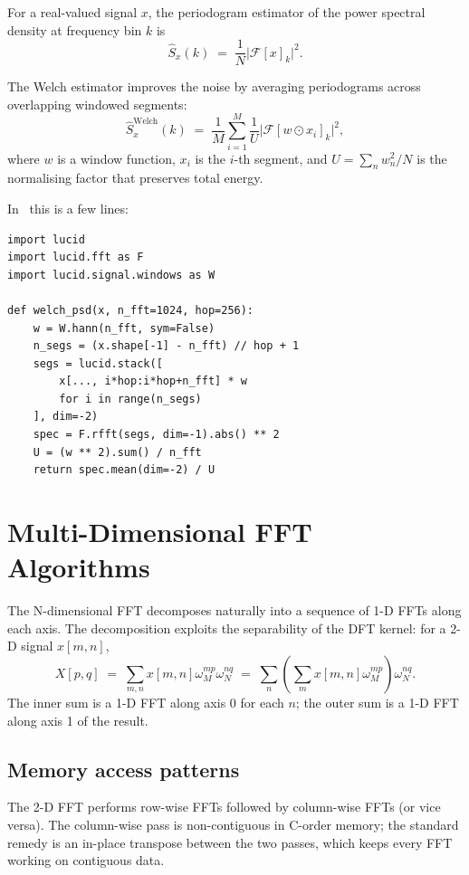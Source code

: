 For a real-valued signal $x$, the periodogram estimator of the
power spectral density at frequency bin $k$ is
\[
\hat S_x(k) \;=\; \frac{1}{N} \bigl|\mathcal{F}[x]_k\bigr|^2.
\]

The Welch estimator \cite{welch_psd_1967} improves the noise by
averaging periodograms across overlapping windowed segments:
\[
\hat S_x^{\mathrm{Welch}}(k)
\;=\; \frac{1}{M} \sum_{i=1}^M \frac{1}{U}\bigl|\mathcal{F}[w \odot x_i]_k\bigr|^2,
\]
where $w$ is a window function, $x_i$ is the $i$-th segment,
and $U = \sum_n w_n^2 / N$ is the normalising factor that
preserves total energy.

In \Lucid\ this is a few lines:

\begin{lstlisting}[style=lucid,language=LucidPython]
import lucid
import lucid.fft as F
import lucid.signal.windows as W

def welch_psd(x, n_fft=1024, hop=256):
    w = W.hann(n_fft, sym=False)
    n_segs = (x.shape[-1] - n_fft) // hop + 1
    segs = lucid.stack([
        x[..., i*hop:i*hop+n_fft] * w
        for i in range(n_segs)
    ], dim=-2)
    spec = F.rfft(segs, dim=-1).abs() ** 2
    U = (w ** 2).sum() / n_fft
    return spec.mean(dim=-2) / U
\end{lstlisting}

\section{Multi-Dimensional FFT Algorithms}
\label{sec:fft:nd_algorithms}

The N-dimensional FFT decomposes naturally into a sequence of
1-D FFTs along each axis. The decomposition exploits the
separability of the DFT kernel: for a 2-D signal $x[m, n]$,
\[
X[p, q] \;=\; \sum_{m, n} x[m, n] \omega_M^{mp} \omega_N^{nq}
\;=\; \sum_n \left(\sum_m x[m, n] \omega_M^{mp}\right) \omega_N^{nq}.
\]
The inner sum is a 1-D FFT along axis 0 for each $n$; the outer
sum is a 1-D FFT along axis 1 of the result.

\subsection{Memory access patterns}
\label{ssec:fft:nd_access}

The 2-D FFT performs row-wise FFTs followed by column-wise FFTs
(or vice versa). The column-wise pass is non-contiguous in
C-order memory; the standard remedy is an in-place transpose
between the two passes, which keeps every FFT working on
contiguous data.

